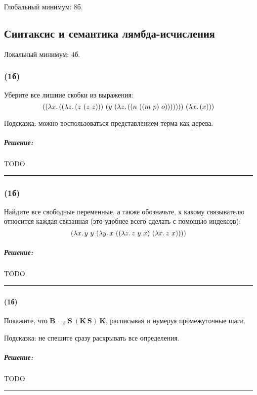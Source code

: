 \documentclass{article}
\newenvironment{proof}{\subparagraph{\hspace{-1em}Решение:\newline}}{\par\noindent\rule{\textwidth}{0.4pt}}
\newcommand{\comb}[1]{\mathbf{#1}}
\newcommand{\eqbeta}{=_\beta}
\begin{document}
    Глобальный минимум: 8б.

    \subsection{Синтаксис и семантика лямбда-исчисления}

    Локальный минимум: 4б.

    \subsubsection{(1б)}

    Уберите все лишние скобки из выражения:
    \[((\lambda x\ldotp ((\lambda z\ldotp (z~(z~z)))~(y~(\lambda z\ldotp ((n~((m~p)~o)))))))~(\lambda x\ldotp (x)))\]

    Подсказка: можно воспользоваться представлением терма как дерева.

    \begin{proof}
        TODO %
    \end{proof}

    \subsubsection{(1б)}

    Найдите все свободные переменные, а также обозначьте, к какому связывателю относится каждая связанная (это удобнее всего сделать с помощью индексов):
    \[(\lambda x\ldotp y~y~(\lambda y\ldotp x~((\lambda z\ldotp z~y~x)~(\lambda x\ldotp z~x))))\]

    \begin{proof}
        TODO %
    \end{proof}

    \subsubsection{}

    \paragraph{(1б)}

    Покажите, что $\comb{B} \eqbeta \comb{S}~(\comb{K}~\comb{S})~\comb{K}$, расписывая и нумеруя промежуточные шаги.

    Подсказка: не спешите сразу раскрывать все определения.

    \begin{proof}
        TODO %
    \end{proof}
\end{document}
